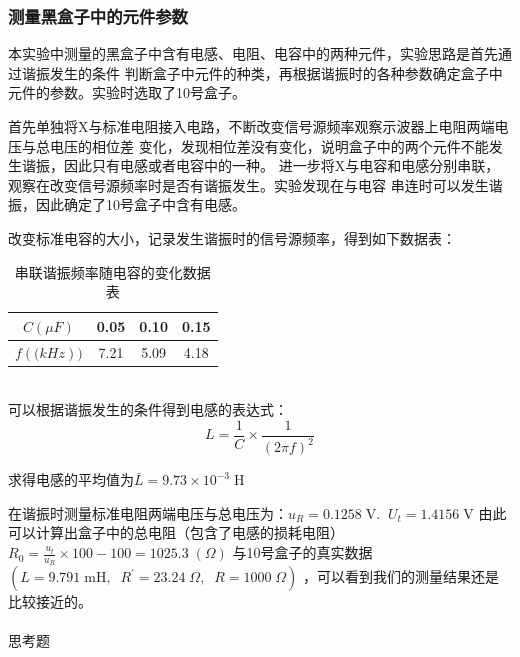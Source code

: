 \documentclass[a4paper]{ctexart}
\makeatletter
\def\V{\mathrm{V}}
\renewcommand{\section}{\@startsection{section}{1}{0mm}
	{-\baselineskip}{0.5\baselineskip}{\bf\leftline}}
\makeatother
\begin{document}
    \subsubsection{测量黑盒子中的元件参数}
    \par 
    本实验中测量的黑盒子中含有电感、电阻、电容中的两种元件，实验思路是首先通过谐振发生的条件
    判断盒子中元件的种类，再根据谐振时的各种参数确定盒子中元件的参数。实验时选取了10号盒子。
    \par 
    首先单独将X与标准电阻接入电路，不断改变信号源频率观察示波器上电阻两端电压与总电压的相位差
    变化，发现相位差没有变化，说明盒子中的两个元件不能发生谐振，因此只有电感或者电容中的一种。
    进一步将X与电容和电感分别串联，观察在改变信号源频率时是否有谐振发生。实验发现在与电容
    串连时可以发生谐振，因此确定了10号盒子中含有电感。
    \par
    改变标准电容的大小，记录发生谐振时的信号源频率，得到如下数据表：
    \begin{table}[htbp]
        \centering
        \caption{串联谐振频率随电容的变化数据表}
        \begin{tabular}{cccc}
            \toprule[1.5pt]
            $C(\mu F)$ & 0.05 & 0.10 & 0.15\\
            \midrule
            $f(\mathrm(kHz))$ & 7.21 & 5.09 & 4.18 \\
            \bottomrule[1.5pt]
        \end{tabular}
    \end{table}
    \\
    可以根据谐振发生的条件得到电感的表达式：
    $$
    L = \frac{1}{C} \times \frac{1}{(2\pi f)^{2}}
    $$
    \par 
    求得电感的平均值为$\bar{L} = 9.73 \times 10^{-3}\;\mathrm{H}$
    \par 
    在谐振时测量标准电阻两端电压与总电压为：$u_{R} = 0.1258\;\V.\;\; U_{t} = 1.4156\;\V$
    由此可以计算出盒子中的总电阻（包含了电感的损耗电阻）$R_{0} = \frac{u_{t}}{u_{R}}\times 100 - 100 = 1025.3 \;(\Omega)$
    与10号盒子的真实数据$(L = 9.791 \;\mathrm{mH},\;\;R^{'} = 23.24\;\Omega,\;\; R = 1000\;\Omega)$
    ，可以看到我们的测量结果还是比较接近的。\\
    \\
    \section{\large{思考题}}
\end{document}
